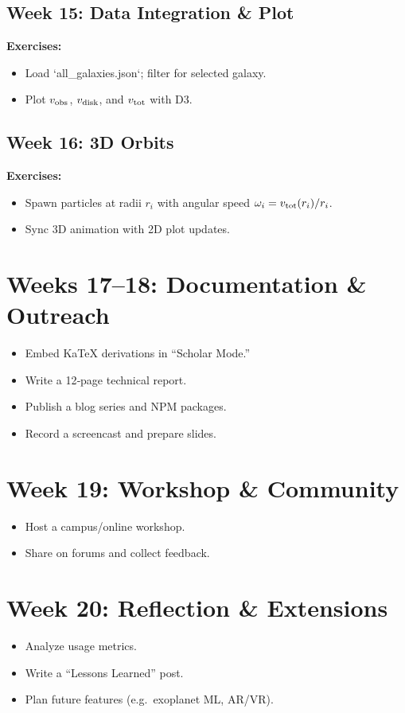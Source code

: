 \documentclass[11pt]{article}
\begin{document}
\subsection{Week 15: Data Integration \& Plot}
\textbf{Exercises:}
\begin{itemize}
  \item Load `all_galaxies.json`; filter for selected galaxy.
  \item Plot \(v_{\rm obs}\), \(v_{\rm disk}\), and \(v_{\rm tot}\) with D3.
\end{itemize}
\subsection{Week 16: 3D Orbits}
\textbf{Exercises:}
\begin{itemize}
  \item Spawn particles at radii \(r_i\) with angular speed \(\omega_i = v_{\rm tot}(r_i)/r_i\).
  \item Sync 3D animation with 2D plot updates.
\end{itemize}

\section{Weeks 17--18: Documentation \& Outreach}
\begin{itemize}
  \item Embed KaTeX derivations in “Scholar Mode.”  
  \item Write a 12‑page technical report.  
  \item Publish a blog series and NPM packages.  
  \item Record a screencast and prepare slides.
\end{itemize}

\section{Week 19: Workshop \& Community}
\begin{itemize}
  \item Host a campus/online workshop.  
  \item Share on forums and collect feedback.
\end{itemize}

\section{Week 20: Reflection \& Extensions}
\begin{itemize}
  \item Analyze usage metrics.  
  \item Write a “Lessons Learned” post.  
  \item Plan future features (e.g.\ exoplanet ML, AR/VR).
\end{itemize}
\end{document}
